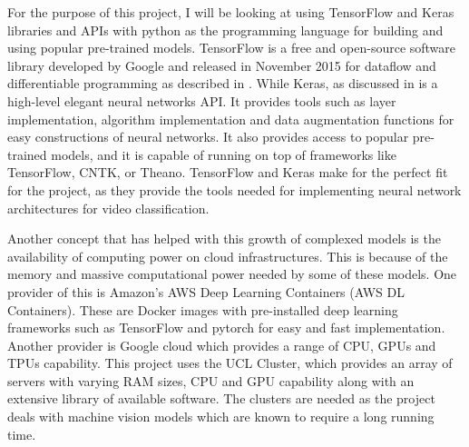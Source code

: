 For the purpose of this project, I will be looking at using TensorFlow and Keras libraries and APIs with python as the programming language for building and using popular pre-trained models. 
TensorFlow is a free and open-source software library developed by Google and released in November 2015 for dataflow and differentiable programming as described in \citep{8578572}. While Keras, as discussed in \citep{Lux:2019:OSC:3310195.3310202} is a high-level elegant neural networks API. 
It provides tools such as layer implementation, algorithm implementation and data augmentation functions for easy constructions of neural networks. It also provides access to popular pre-trained models, and it is capable of running on top of frameworks like TensorFlow, CNTK, or Theano. 
TensorFlow and Keras make for the perfect fit for the project, as they provide the tools needed for implementing neural network architectures for video classification.

Another concept that has helped with this growth of complexed models is the availability of computing power on cloud infrastructures. This is because of the memory and massive computational power needed by some of these models. One provider of this is Amazon's  AWS Deep Learning Containers (AWS DL Containers).
These are Docker images with pre-installed deep learning frameworks such as TensorFlow and pytorch for easy and fast implementation. Another provider is Google cloud which provides a range of CPU, GPUs and TPUs capability. 
This project uses the UCL Cluster, which provides an array of servers with varying RAM sizes,  CPU and GPU capability along with an extensive library of available software.  The clusters are needed as the project deals with machine vision models which are known to require a long running time.  
    
